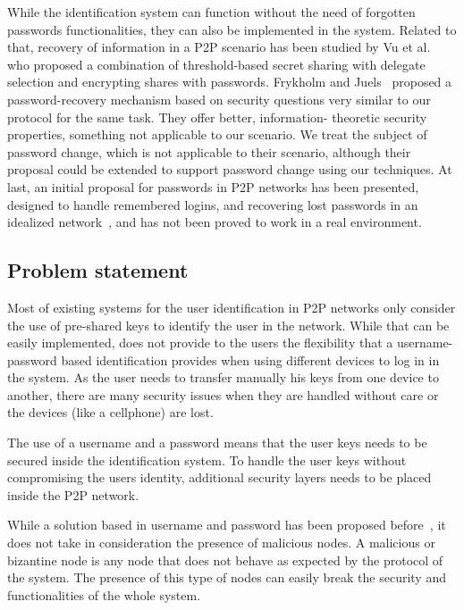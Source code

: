 \documentclass[12pt,spanish]{article}
\begin{document}
While the identification system can function without the need of forgotten
passwords functionalities, they can also be implemented in the system.
Related to that, recovery of information in a P2P scenario has been studied by Vu et al.~\cite{5380695} who proposed
a combination of threshold-based secret sharing with delegate
selection and encrypting shares with passwords.
Frykholm and Juels~\cite{Frykholm:2001:EPR:501983.501985} proposed a password-recovery
mechanism based on security questions very similar to our
protocol for the same task. They offer better, information-
theoretic security properties, something not applicable to our
scenario. We treat the subject of password change, which is not applicable to
their scenario, although their proposal could be extended to support password
change using our techniques.
At last, an initial proposal for passwords in P2P networks has been presented,
designed to handle remembered logins, and recovering lost passwords
in an idealized network~\cite{kreitz2012passwords}, and has not been proved to
work in a real environment.

\subsection{Problem statement}

Most of existing systems for the user identification in P2P networks only consider the
use of pre-shared keys to identify the user in the network. While that can
be easily implemented, does not provide to the users the flexibility that a
username-password based identification provides when using different devices to
log in in the system. As the user needs to transfer manually his keys from one
device to another, there are many security issues when they are handled without
care or the devices (like a cellphone) are lost. 

The use of a username and a password means that the user keys needs to be secured inside the identification system.
To handle the user keys without compromising the users identity, additional
security layers needs to be placed inside the P2P network.

While a solution based in username and password has been proposed
before~\cite{kreitz2012passwords}, it does not take in consideration the
presence of malicious nodes. A malicious or bizantine node is any node that does
not behave as expected by the protocol of the system. The presence of this type
of nodes can easily break the security and functionalities of the whole system.
\end{document}
